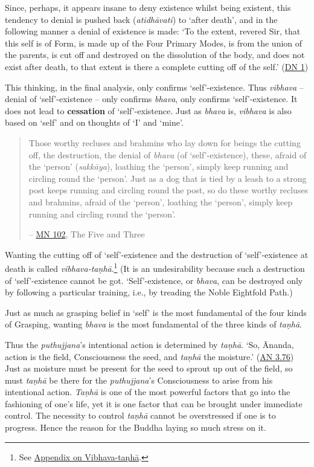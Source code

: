 Since, perhaps, it appears insane to deny existence whilst being existent, this tendency to denial is pushed back (\emph{atidhāvati}) to `after death', and in the following manner a denial of existence is made: `To the extent, revered Sir, that this self is of Form, is made up of the Four Primary Modes, is from the union of the parents, is cut off and destroyed on the dissolution of the body, and does not exist after death, to that extent is there a complete cutting off of the self.' (\href{https://suttacentral.net/dn1/en/bodhi}{DN 1})

This thinking, in the final analysis, only confirms `self'-existence. Thus \emph{vibhava} -- denial of `self'-existence -- only confirms \emph{bhava}, only confirms `self'-existence. It does not lead to \textbf{cessation} of `self'-existence. Just as \emph{bhava} is, \emph{vibhava} is also based on `self' and on thoughts of `I' and `mine'.

\begin{quote}
Those worthy recluses and brahmins who lay down for beings the cutting off, the destruction, the denial of \emph{bhava} (of `self'-existence), these, afraid of the `person' (\emph{sakkāya}), loathing the `person', simply keep running and circling round the `person'. Just as a dog that is tied by a leash to a strong post keeps running and circling round the post, so do these worthy recluses and brahmins, afraid of the `person', loathing the `person', simply keep running and circling round the `person'.

 -- \href{https://suttacentral.net/mn102/en/sujato}{MN 102}, The Five and Three
\end{quote}

Wanting the cutting off of `self'-existence and the destruction of `self'-existence at death is called \emph{vibhava-taṇhā}.\footnote{See \href{ch-99-appendix.xml\#vibhava-tanha}{Appendix on Vibhava-taṇhā}.} (It is an undesirability because such a destruction of `self'-existence cannot be got. `Self'-existence, or \emph{bhava}, can be destroyed only by following a particular training, i.e., by treading the Noble Eightfold Path.)

Just as much as grasping belief in `self' is the most fundamental of the four kinds of Grasping, wanting \emph{bhava} is the most fundamental of the three kinds of \emph{taṇhā}.

Thus the \emph{puthujjana}'s intentional action is determined by \emph{taṇhā}. `So, Ānanda, action is the field, Consciousness the seed, and \emph{taṇhā} the moisture.' (\href{https://suttacentral.net/an3.76/en/thanissaro}{AN 3.76}) Just as moisture must be present for the seed to sprout up out of the field, so must \emph{taṇhā} be there for the \emph{puthujjana}'s Consciousness to arise from his intentional action. \emph{Taṇhā} is one of the most powerful factors that go into the fashioning of one's life, yet it is one factor that can be brought under immediate control. The necessity to control \emph{taṇhā} cannot be overstressed if one is to progress. Hence the reason for the Buddha laying so much stress on it.

